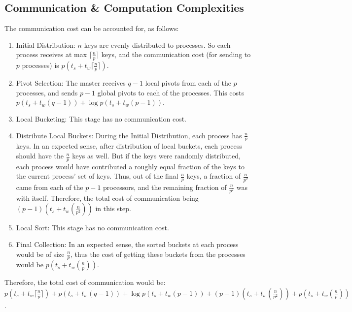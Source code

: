 \documentclass{article}
\begin{document}
\subsection{Communication \& Computation Complexities}
The communication cost can be accounted for, as follows:
\begin{enumerate}
\item Initial Distribution: $n$ keys are evenly distributed to processes. So each process
receives at max $\lceil\frac{n}{p}\rceil$ keys, and the communication cost (for sending to $p$ processes) is
$p(t_s + t_w\lceil\frac{n}{p}\rceil)$.
\item Pivot Selection: The master receives $q-1$ local pivots from each of the $p$ processes, 
and sends $p-1$ global pivots to each of the processes. This costs $p(t_s + t_w(q-1)) + 
\log{p}(t_s + t_w(p-1))$.
\item Local Bucketing: This stage has no communication cost.
\item Distribute Local Buckets: During the Initial Distribution, each process has $\frac{n}{p}$
keys. In an expected sense, after distribution of local buckets, each process should have 
the $\frac{n}{p}$ keys as well. But if the keys were randomly distributed, each process would have
contributed a roughly equal fraction of the keys to the current process' set of keys. Thus, out of
the final $\frac{n}{p}$ keys, a fraction of $\frac{n}{p^2}$ came from each of the $p-1$ processors,
and the remaining fraction of $\frac{n}{p^2}$ was with itself. Therefore, the total cost of 
communication being $(p-1)(t_s + t_w(\frac{n}{p^2}))$ in this step.
\item Local Sort: This stage has no communication cost.
\item Final Collection: In an expected sense, the sorted buckets at each process would be of size
$\frac{n}{p}$, thus the cost of getting these buckets from the processes would be
$p(t_s + t_w(\frac{n}{p}))$.
\end{enumerate}
Therefore, the total cost of communication would be: $p(t_s + t_w\lceil\frac{n}{p}\rceil) + p(t_s + t_w(q-1)) + 
\log{p}(t_s + t_w(p-1)) + (p-1)(t_s + t_w(\frac{n}{p^2})) + p(t_s + t_w(\frac{n}{p}))$.
\end{document}
